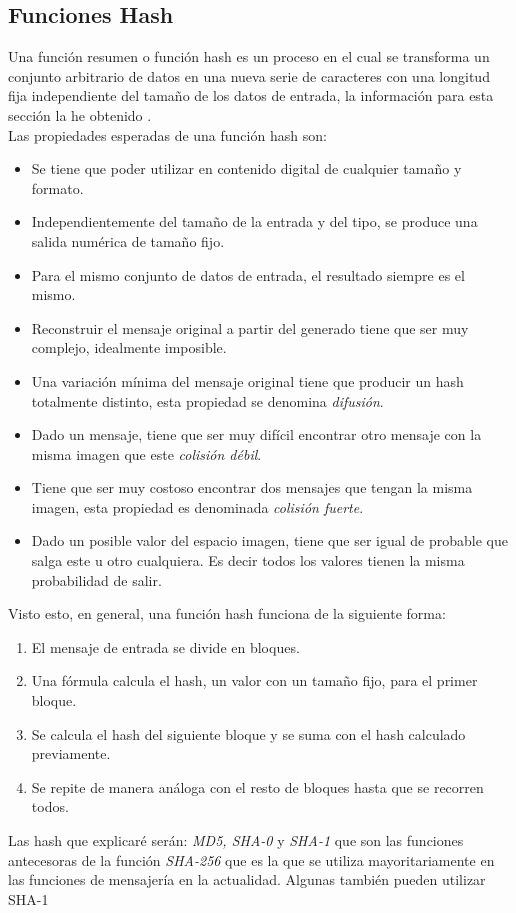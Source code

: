 \begin{aligned*}
\section{Funciones Hash}
Una función resumen o función hash es un proceso en el cual se transforma un conjunto arbitrario de datos en una nueva serie de caracteres con una longitud fija independiente del tamaño de los datos de entrada, la información para esta sección la he obtenido \cite{aepd}.\\
Las propiedades esperadas de una función hash son:\\
\begin{itemize}
	\item Se tiene que poder utilizar en contenido digital de cualquier tamaño y formato.
	\item Independientemente del tamaño de la entrada y del tipo, se produce una salida numérica de tamaño fijo.
	\item Para el mismo conjunto de datos de entrada, el resultado siempre es el mismo.
	\item Reconstruir el mensaje original a partir del generado tiene que ser muy complejo, idealmente imposible.
	\item Una variación mínima del mensaje original tiene que producir un hash totalmente distinto, esta propiedad se denomina \emph{difusión}.
	\item Dado un mensaje, tiene que ser muy difícil encontrar otro mensaje con la misma imagen que este \emph{colisión débil}.
	\item Tiene que ser muy costoso encontrar dos mensajes que tengan la misma imagen, esta propiedad es denominada \emph{colisión fuerte}.
	\item Dado un posible valor del espacio imagen, tiene que ser igual de probable que salga este u otro cualquiera. Es decir todos los valores tienen la misma probabilidad de salir.
\end{itemize}

Visto esto, en general, una función hash funciona de la siguiente forma:
\begin{enumerate}
	\item El mensaje de entrada se divide en bloques.
	\item Una fórmula calcula el hash, un valor con un tamaño fijo, para el primer bloque.
	\item Se calcula el hash del siguiente bloque y se suma con el hash calculado previamente.
	\item Se repite de manera análoga con el resto de bloques hasta que se recorren todos.
\end{enumerate}
Las hash que explicaré serán: \emph{MD5, SHA-0} y \emph{SHA-1} que son las funciones antecesoras de la función \emph{SHA-256} que es la que se utiliza mayoritariamente en las funciones de mensajería en la actualidad. Algunas también pueden utilizar SHA-1\\


\end{aligned*}
